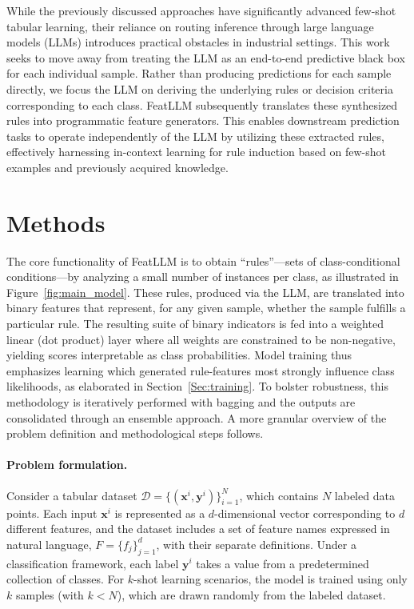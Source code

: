 While the previously discussed approaches have significantly advanced few-shot tabular learning, their reliance on routing inference through large language models (LLMs) introduces practical obstacles in industrial settings. This work seeks to move away from treating the LLM as an end-to-end predictive black box for each individual sample. Rather than producing predictions for each sample directly, we focus the LLM on deriving the underlying rules or decision criteria corresponding to each class. \textsf{FeatLLM} subsequently translates these synthesized rules into programmatic feature generators. This enables downstream prediction tasks to operate independently of the LLM by utilizing these extracted rules, effectively harnessing in-context learning for rule induction based on few-shot examples and previously acquired knowledge.

\section{Methods}
The core functionality of \textsf{FeatLLM} is to obtain “rules”—sets of class-conditional conditions—by analyzing a small number of instances per class, as illustrated in Figure~\ref{fig:main_model}. These rules, produced via the LLM, are translated into binary features that represent, for any given sample, whether the sample fulfills a particular rule. The resulting suite of binary indicators is fed into a weighted linear (dot product) layer where all weights are constrained to be non-negative, yielding scores interpretable as class probabilities. Model training thus emphasizes learning which generated rule-features most strongly influence class likelihoods, as elaborated in Section~\ref{Sec:training}. To bolster robustness, this methodology is iteratively performed with bagging and the outputs are consolidated through an ensemble approach. A more granular overview of the problem definition and methodological steps follows.

\vspace*{-0.12in}
\paragraph{Problem formulation.} Consider a tabular dataset $\mathcal{D} = \{(\mathbf{x}^i, \mathbf{y}^i)\}_{i=1}^{N}$, which contains $N$ labeled data points. Each input $\mathbf{x}^i$ is represented as a $d$-dimensional vector corresponding to $d$ different features, and the dataset includes a set of feature names expressed in natural language, $F = \{f_j\}_{j=1}^{d}$, with their separate definitions. Under a classification framework, each label $\mathbf{y}^i$ takes a value from a predetermined collection of classes. For $k$-shot learning scenarios, the model is trained using only $k$ samples (with $k < N$), which are drawn randomly from the labeled dataset.

